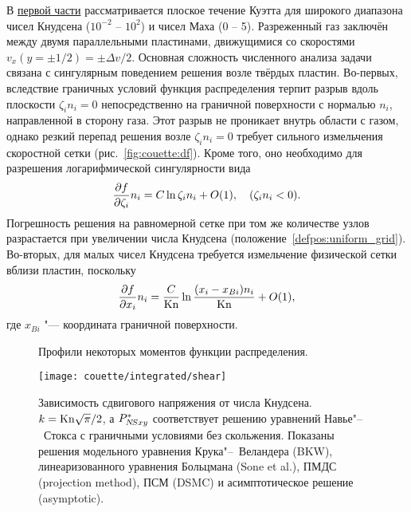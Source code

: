 В \underline{первой части} рассматривается плоское течение Куэтта для широкого диапазона
чисел Кнудсена (\(10^{-2}\) -- \(10^2\)) и чисел Маха (0 -- 5).
Разреженный газ заключён между двумя параллельными пластинами, движущимися со скоростями \(v_x(y=\pm1/2)=\pm\Delta{v}/2\).
Основная сложность численного анализа задачи связана с сингулярным поведением решения возле твёрдых пластин.
Во-первых, вследствие граничных условий функция распределения терпит разрыв вдоль плоскости \(\zeta_in_i=0\)
непосредственно на граничной поверхности с нормалью \(n_i\), направленной в сторону газа.
Этот разрыв не проникает внутрь области с газом, однако резкий перепад решения возле \(\zeta_in_i=0\)
требует сильного измельчения скоростной сетки (рис.~\ref{fig:couette:df}).
Кроме того, оно необходимо для разрешения логарифмической сингулярности вида~\autocite{Takata2016}
\begin{equation*}
    \pder[f]{\zeta_i}n_i = C\ln\zeta_in_i + \OO{1}, \quad (\zeta_in_i<0).
\end{equation*}
Погрешность решения на равномерной сетке при том же количестве узлов
разрастается при увеличении числа Кнудсена (положение~\ref{defpos:uniform_grid}).
Во-вторых, для малых чисел Кнудсена требуется измельчение физической сетки вблизи пластин, поскольку
\begin{equation*}
    \pder[f]{x_i}n_i = \frac{C}{\Kn}\ln\frac{(x_i-x_{Bi})n_i}{\Kn} + \OO{1},
\end{equation*}
где \(x_{Bi}\) "--- координата граничной поверхности.

\begin{figure}
    \centering
    \caption{Профили некоторых моментов функции распределения.}
    \label{fig:couette:profiles}
\end{figure}

\begin{figure}
    \centering
    \texttt{[image: couette/integrated/shear]}
    \caption{Зависимость сдвигового напряжения от числа Кнудсена. \(k=\Kn\sqrt\pi/2\),
        а \(P_{\NS xy}^*\) соответствует решению уравнений Навье"--~Стокса с граничными условиями без скольжения.
        Показаны решения
        модельного уравнения Крука"--~Веландера (BKW),
        линеаризованного уравнения Больцмана (Sone et al.),
        ПМДС (projection method), ПСМ (DSMC) и
        асимптотическое решение (asymptotic).}
    \label{fig:couette:shear}
\end{figure}

